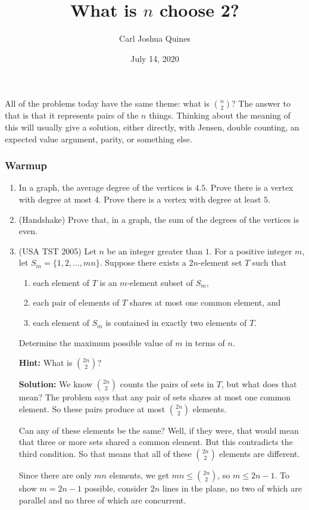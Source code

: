 \documentclass[11pt,paper=letter]{scrartcl}
\begin{document}
\title{What is $n$ choose 2?}
\author{Carl Joshua Quines}
\date{July 14, 2020}

\maketitle

All of the problems today have the same theme: what is $\binom{n}{2}$? The answer to that is that it represents pairs of the $n$ things. Thinking about the meaning of this will usually give a solution, either directly, with Jensen, double counting, an expected value argument, parity, or something else.

\subsubsection*{Warmup}

\begin{enumerate}

\item In a graph, the average degree of the vertices is $4.5$. Prove there is a vertex with degree at most $4$. Prove there is a vertex with degree at least $5$.

\item (Handshake) Prove that, in a graph, the sum of the degrees of the vertices is even.

\item (USA TST 2005) Let $n$ be an integer greater than $1$. For a positive integer $m$, let $S_m = \{1, 2, \ldots, mn\}$. Suppose there exists a $2n$-element set $T$ such that
\begin{enumerate}
  \item each element of $T$ is an $m$-element subset of $S_m$,
  \item each pair of elements of $T$ shares at most one common element, and
  \item each element of $S_m$ is contained in exactly two elements of $T$.
\end{enumerate}
Determine the maximum possible value of $m$ in terms of $n$.

\textbf{Hint:} What is $\binom{2n}{2}$?

\textbf{Solution:} We know $\binom{2n}{2}$ counts the pairs of sets in $T$, but what does that mean? The problem says that any pair of sets shares at most one common element. So these pairs produce at most $\binom{2n}{2}$ elements.

Can any of these elements be the same? Well, if they were, that would mean that three or more sets shared a common element. But this contradicts the third condition. So that means that all of these $\binom{2n}{2}$ elements are different.

Since there are only $mn$ elements, we get $mn \le \binom{2n}{2}$, so $m \le 2n - 1$. To show $m = 2n - 1$ possible, consider $2n$ lines in the plane, no two of which are parallel and no three of which are concurrent.

\end{enumerate}
\end{document}
